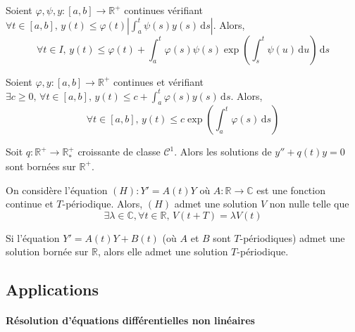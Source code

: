 
	\begin{lemma}[Gronwall]
		Soient $\varphi, \psi, y : [a,b] \rightarrow \mathbb{R}^+$ continues vérifiant $\forall t \in [a,b], \, y(t) \leq \varphi(t) \left | \int_a^t \psi(s) y(s) \, \mathrm{d}s \right |$. Alors,
		\[ \forall t \in I, \, y(t) \leq \varphi(t) + \int_a^t \varphi(s) \psi(s) \exp \left( \int_s^t \psi(u) \, \mathrm{d}u \right) \, \mathrm{d}s \]
	\end{lemma}

	\begin{corollary}
		Soient $\varphi, y : [a,b] \rightarrow \mathbb{R}^+$  continues et vérifiant $\exists c \geq 0, \, \forall t \in [a, b], \, y(t) \leq c + \int_a^t \varphi(s) y(s) \, \mathrm{d}s$. Alors,
		\[ \forall t \in [a,b], \, y(t) \leq c \exp \left( \int_a^t \varphi(s) \, \mathrm{d}s \right) \]
	\end{corollary}

	\begin{application}
		Soit $q : \mathbb{R}^+ \rightarrow \mathbb{R}^+_*$ croissante de classe $\mathcal{C}^1$. Alors les solutions de $y'' + q(t) y = 0$ sont bornées sur $\mathbb{R}^+$.
	\end{application}


	\begin{theorem}[Floquet]
		On considère l'équation $(H) : Y' = A(t) Y$ où $A : \mathbb{R} \rightarrow \mathbb{C}$ est une fonction continue et $T$-périodique. Alors, $(H)$ admet une solution $V$ non nulle telle que
		\[ \exists \lambda \in \mathbb{C}, \forall t \in \mathbb{R}, \, V(t+T) = \lambda V(t) \]
	\end{theorem}


	\begin{theorem}[Massera]
		Si l'équation $Y' = A(t) Y + B(t)$ (où $A$ et $B$ sont $T$-périodiques) admet une solution bornée sur $\mathbb{R}$, alors elle admet une solution $T$-périodique.
	\end{theorem}

	\subsection{Applications}

	\paragraph{Résolution d'équations différentielles non linéaires}

